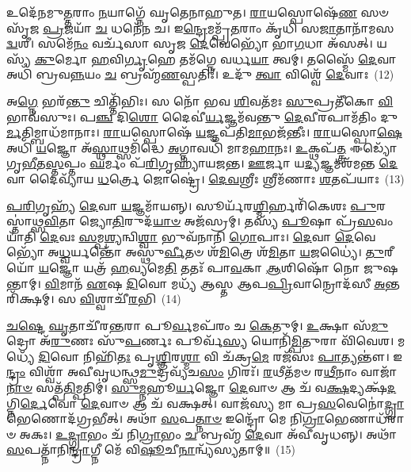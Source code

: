 {\anuvakamend[{\-\ul{𑌜}\-𑌜𑌾\-\ul{𑌨𑍈}\-𑌨𑍗𑌷᳴𑌧𑍀\-\ul{𑌨𑌾𑌂} 𑌭𑍂𑌮𑌿𑌂᳴ \ul{𑌜}\-𑌨𑌯᳴\-\ul{𑌨𑍍𑌨𑍂}\-𑌤\-\ul{𑌯𑍇} 𑌨\-\ul{𑌮𑍋} 𑌨𑌵᳴ 𑌚}]}%

𑌉𑌦𑍇᳴𑌨𑌮𑍁\-\ul{𑌤𑍍𑌤}\-𑌰𑌾𑌂 \ul{𑌨}\-𑌯𑌾𑌗𑍍𑌨𑍇᳴ 𑌘𑍃𑌤𑍇𑌨𑌾𑌹𑍁𑌤। \ul{𑌰𑌾}\-𑌯𑌸𑍍𑌪𑍋𑌷𑍇᳴\-\ul{𑌣} 𑌸𑍞 𑌸𑍃᳴𑌜 \ul{𑌪𑍍𑌰}\-𑌜𑌯𑌾᳴ \ul{𑌚} 𑌧𑌨𑍇᳴𑌨 𑌚। 𑌇\-\ul{𑌨𑍍𑌦𑍍𑌰𑍇}\-𑌮𑌮𑍍𑌪𑍍𑌰᳴\-\ul{𑌤}\-𑌰𑌾𑌂 𑌕𑍃᳴𑌧𑌿 𑌸\-\ul{𑌜𑌾}\-𑌤𑌾𑌨𑌾᳴𑌮𑌸\-\ul{𑌦𑍍𑌵}\-𑌶𑍀। 𑌸𑌮𑍇᳴\-\ul{𑌨𑌂} 𑌵𑌰𑍍𑌚᳴𑌸𑌾 𑌸𑍃𑌜 \ul{𑌦𑍇}\-𑌵𑍇𑌭𑍍𑌯𑍋᳴ 𑌭𑌾\-\ul{𑌗}\-𑌧𑌾 𑌅᳴𑌸𑌤𑍍। 𑌯𑌸𑍍𑌯᳴ \ul{𑌕𑍁}\-𑌰𑍍𑌮𑍋 \ul{𑌹}\-𑌵𑌿\-\ul{𑌰𑍍𑌗𑍃}\-𑌹𑍇 𑌤𑌮᳴𑌗𑍍𑌨𑍇 𑌵𑌰𑍍𑌧\-\ul{𑌯𑌾} 𑌤𑍍𑌵𑌮𑍍। 𑌤𑌸𑍍𑌮𑍈᳴ \ul{𑌦𑍇}\-𑌵𑌾 𑌅𑌧𑌿᳴ 𑌬𑍍𑌰𑌵\-\ul{𑌨𑍍𑌨}\-𑌯𑌂 \ul{𑌚} 𑌬𑍍𑌰𑌹𑍍𑌮᳴\-\ul{𑌣}\-𑌸𑍍𑌪𑌤𑌿𑌃᳴। 𑌉𑌦𑍁᳴ \ul{𑌤𑍍𑌵𑌾} 𑌵𑌿𑌶𑍍𑌵𑍇᳴ \ul{𑌦𑍇}\-𑌵𑌾𑌃~(12)

𑌅\-\ul{𑌗𑍍𑌨𑍇} 𑌭𑌰᳴\-\ul{𑌨𑍍𑌤𑍁} 𑌚𑌿𑌤𑍍𑌤𑌿᳴𑌭𑌿𑌃। 𑌸 𑌨𑍋᳴ 𑌭𑌵 \ul{𑌶𑌿}\-𑌵𑌤᳴𑌮𑌃 \ul{𑌸𑍁}\-𑌪𑍍𑌰𑌤𑍀᳴𑌕𑍋 \ul{𑌵𑌿}\-𑌭𑌾𑌵᳴𑌸𑍁𑌃। 𑌪\-\ul{𑌞𑍍𑌚} 𑌦𑌿\-\ul{𑌶𑍋} 𑌦𑍈𑌵𑍀॑\-\ul{𑌰𑍍𑌯}\-𑌜𑍍𑌞𑌮᳴𑌵𑌨𑍍𑌤𑍁 \ul{𑌦𑍇}\-𑌵𑍀𑌰𑌪𑌾𑌮᳴𑌤𑌿𑌂 𑌦𑍁\-\ul{𑌰𑍍𑌮}\-𑌤𑌿𑌮𑍍𑌬𑌾𑌧᳴𑌮𑌾𑌨𑌾𑌃। \ul{𑌰𑌾}\-𑌯𑌸𑍍𑌪𑍋𑌷𑍇᳴ \ul{𑌯}\-𑌜𑍍𑌞𑌪᳴𑌤𑌿\-\ul{𑌮𑌾}\-𑌭𑌜᳴𑌨𑍍𑌤𑍀𑌃। \ul{𑌰𑌾}\-𑌯𑌸𑍍𑌪𑍋\-\ul{𑌷𑍇} 𑌅𑌧𑌿᳴ \ul{𑌯}\-𑌜𑍍𑌞𑍋 𑌅᳴\-\ul{𑌸𑍍𑌥𑌾}\-𑌥𑍍𑌸𑌮𑌿᳴𑌦𑍍𑌧𑍇 \ul{𑌅}\-𑌗𑍍𑌨𑌾𑌵𑌧𑌿᳴ 𑌮𑌾𑌮\-\ul{𑌹𑌾}\-𑌨𑌃। \ul{𑌉}\-𑌕𑍍𑌥𑌪᳴\-\ul{𑌤𑍍𑌤𑍍𑌰} 𑌈𑌡𑍍𑌯𑍋᳴ 𑌗𑍃\-\ul{𑌭𑍀}\-𑌤\-\ul{𑌸𑍍𑌤}\-𑌪𑍍𑌤𑌂 \ul{𑌘}\-𑌰𑍍𑌮𑌂 𑌪᳴\-\ul{𑌰𑌿}\-𑌗𑍃𑌹𑍍𑌯𑌾᳴𑌯𑌜𑌨𑍍𑌤। \ul{𑌊}\-𑌰𑍍𑌜𑌾 𑌯\-\ul{𑌦𑍍𑌯}\-𑌜𑍍𑌞𑌮𑌶᳴𑌮𑌨𑍍𑌤 \ul{𑌦𑍇}\-𑌵𑌾 𑌦𑍈𑌵𑍍𑌯𑌾᳴𑌯 \ul{𑌧}\-𑌰𑍍𑌤𑍍𑌰𑍇 𑌜𑍋𑌷𑍍𑌟𑍍𑌰𑍇॑। \ul{𑌦𑍇}\-\-\ul{𑌵}\-𑌶𑍍𑌰𑍀𑌃 𑌶𑍍𑌰𑍀𑌮᳴𑌣𑌾𑌃 \ul{𑌶}\-𑌤𑌪᳴𑌯𑌾𑌃~(13)

\-\ul{𑌪}\-\-\ul{𑌰𑌿}\-𑌗𑍃𑌹𑍍𑌯᳴ \ul{𑌦𑍇}\-𑌵𑌾 \ul{𑌯}\-𑌜𑍍𑌞𑌮𑌾᳴𑌯𑌨𑍍𑌨𑍍। 𑌸𑍂𑌰𑍍𑌯᳴𑌰\-\ul{𑌶𑍍𑌮𑌿}\-𑌰𑍍\mbox{}𑌹𑌰𑌿᳴𑌕𑍇𑌶𑌃 \ul{𑌪𑍁}\-𑌰𑌸𑍍𑌤𑌾॑𑌥𑍍𑌸\-\ul{𑌵𑌿}\-𑌤𑌾 𑌜𑍍𑌯𑍋\-\ul{𑌤𑌿}\-𑌰𑍁𑌦᳴\-\ul{𑌯𑌾}\-\-\ul{𑍞} 𑌅𑌜᳴𑌸𑍍𑌰𑌮𑍍। 𑌤𑌸𑍍𑌯᳴ \ul{𑌪𑍂}\-𑌷𑌾 𑌪𑍍𑌰᳴\-\ul{𑌸}\-𑌵𑌂 𑌯𑌾᳴𑌤𑌿 \ul{𑌦𑍇}\-𑌵𑌃 \ul{𑌸}\-𑌮𑍍𑌪\-\ul{𑌶𑍍𑌯}\-𑌨𑍍𑌵𑌿\-\ul{𑌶𑍍𑌵𑌾} 𑌭𑍁𑌵᳴𑌨𑌾𑌨𑌿 \ul{𑌗𑍋}\-𑌪𑌾𑌃। \ul{𑌦𑍇}\-𑌵𑌾 \ul{𑌦𑍇}\-𑌵𑍇𑌭𑍍𑌯𑍋᳴ 𑌅\-\ul{𑌧𑍍𑌵}\-𑌰𑍍𑌯𑌨𑍍𑌤𑍋᳴ 𑌅𑌸𑍍𑌥𑍁\-\ul{𑌰𑍍𑌵𑍀}\-𑌤𑍞 𑌶᳴\-\ul{𑌮𑌿}\-𑌤𑍍𑌰𑍇 𑌶᳴\-\ul{𑌮𑌿}\-𑌤𑌾 \ul{𑌯}\-𑌜𑌧𑍍𑌯𑍈॑। \ul{𑌤𑍁}\-𑌰𑍀𑌯𑍋᳴ \ul{𑌯}\-𑌜𑍍𑌞𑍋 𑌯𑌤𑍍𑌰᳴ \ul{𑌹}\-𑌵𑍍𑌯𑌮𑍇\-\ul{𑌤𑌿} 𑌤𑌤𑌃᳴ 𑌪𑌾\-\ul{𑌵}\-𑌕𑌾 \ul{𑌆}\-𑌶𑌿𑌷𑍋᳴ 𑌨𑍋 𑌜𑍁𑌷𑌨𑍍𑌤𑌾𑌮𑍍। \ul{𑌵𑌿}\-𑌮𑌾𑌨᳴ \ul{𑌏}\-𑌷 \ul{𑌦𑌿}\-𑌵𑍋 𑌮𑌧𑍍𑌯᳴ 𑌆𑌸𑍍𑌤 𑌆𑌪\-\ul{𑌪𑍍𑌰𑌿}\-𑌵𑌾𑌨𑍍𑌰𑍋𑌦᳴𑌸𑍀 \ul{𑌅}\-𑌨𑍍𑌤𑌰𑌿᳴𑌕𑍍𑌷𑌮𑍍। 𑌸 \ul{𑌵𑌿}\-𑌶𑍍𑌵𑌾𑌚𑍀᳴\-\ul{𑌰}\-𑌭𑌿~(14)

\-\ul{𑌚}\-\-\ul{𑌷𑍍𑌟𑍇} \ul{𑌘𑍃}\-𑌤𑌾𑌚𑍀᳴𑌰\-\ul{𑌨𑍍𑌤}\-𑌰𑌾 𑌪𑍂\-\ul{𑌰𑍍𑌵}\-𑌮𑌪᳴𑌰𑌂 𑌚 \ul{𑌕𑍇}\-𑌤𑍁𑌮𑍍। \ul{𑌉}\-𑌕𑍍𑌷𑌾 𑌸᳴\-\ul{𑌮𑍁}\-𑌦𑍍𑌰𑍋 𑌅᳴\-\ul{𑌰𑍁}\-𑌣𑌃 𑌸𑍁᳴\-\ul{𑌪}\-𑌰𑍍𑌣𑌃 𑌪𑍂𑌰𑍍𑌵᳴\-\ul{𑌸𑍍𑌯} 𑌯𑍋𑌨𑌿᳴\-\ul{𑌮𑍍𑌪𑌿}\-𑌤𑍁𑌰𑌾 𑌵𑌿᳴𑌵𑍇𑌶। 𑌮𑌧𑍍𑌯𑍇᳴ \ul{𑌦𑌿}\-𑌵𑍋 𑌨𑌿𑌹𑌿᳴\-\ul{𑌤𑌃} 𑌪𑍃\-\ul{𑌶𑍍𑌞𑌿}\-𑌰\-\ul{𑌶𑍍𑌮𑌾} 𑌵𑌿 𑌚᳴𑌕𑍍𑌰\-\ul{𑌮𑍇} 𑌰𑌜᳴𑌸𑌃 \ul{𑌪𑌾}\-𑌤𑍍𑌯𑌨𑍍𑌤𑍗॑। 𑌇\-\ul{𑌨𑍍𑌦𑍍𑌰𑌂} 𑌵𑌿𑌶𑍍𑌵𑌾᳴ 𑌅𑌵𑍀𑌵𑍃𑌧𑌨𑍍𑌥𑍍𑌸\-\ul{𑌮𑍁}\-𑌦𑍍𑌰𑌵𑍍𑌯᳴𑌚\-\ul{𑌸𑌂} 𑌗𑌿𑌰𑌃᳴। \ul{𑌰}\-𑌥𑍀𑌤᳴𑌮𑍞 𑌰\-\ul{𑌥𑍀}\-𑌨𑌾𑌂 𑌵𑌾𑌜𑌾᳴\-\ul{𑌨𑌾}\-\-\ul{𑍞} 𑌸𑌤𑍍𑌪᳴\-\ul{𑌤𑌿}\-𑌮𑍍𑌪𑌤𑌿𑌮𑍍॑। \ul{𑌸𑍁}\-\-\ul{𑌮𑍍𑌨}\-𑌹𑍂\-\ul{𑌰𑍍𑌯}\-𑌜𑍍𑌞𑍋 \ul{𑌦𑍇}\-𑌵𑌾𑍞 𑌆 𑌚᳴ 𑌵\-\ul{𑌕𑍍𑌷}\-𑌦𑍍𑌯𑌕𑍍𑌷᳴\-\ul{𑌦}\-𑌗𑍍𑌨𑌿\-\ul{𑌰𑍍𑌦𑍇}\-𑌵𑍋 \ul{𑌦𑍇}\-𑌵𑌾𑍞 𑌆 𑌚᳴ 𑌵𑌕𑍍𑌷𑌤𑍍। 𑌵𑌾𑌜᳴𑌸𑍍𑌯 𑌮𑌾 𑌪𑍍𑌰\-\ul{𑌸}\-𑌵𑍇𑌨𑍋॑\-\ul{𑌦𑍍𑌗𑍍𑌰𑌾}\-𑌭𑍇𑌣𑍋𑌦᳴𑌗𑍍𑌰𑌭𑍀𑌤𑍍। 𑌅𑌥𑌾᳴ \ul{𑌸}\-𑌪\-\ul{𑌤𑍍𑌨𑌾}\-\-\ul{𑍞} 𑌇𑌨𑍍𑌦𑍍𑌰𑍋᳴ 𑌮𑍇 𑌨𑌿\-\ul{𑌗𑍍𑌰𑌾}\-𑌭𑍇𑌣𑌾𑌧᳴𑌰𑌾𑍞 𑌅𑌕𑌃। \ul{𑌉}\-\-\ul{𑌦𑍍𑌗𑍍𑌰𑌾}\-𑌭𑌂 𑌚᳴ 𑌨𑌿\-\ul{𑌗𑍍𑌰𑌾}\-𑌭𑌂 \ul{𑌚} 𑌬𑍍𑌰𑌹𑍍𑌮᳴ \ul{𑌦𑍇}\-𑌵𑌾 𑌅᳴𑌵𑍀𑌵𑍃𑌧𑌨𑍍𑌨𑍍। 𑌅𑌥𑌾᳴ \ul{𑌸}\-𑌪𑌤𑍍𑌨𑌾᳴𑌨𑌿\-\ul{𑌨𑍍𑌦𑍍𑌰𑌾}\-𑌗𑍍𑌨𑍀 𑌮𑍇᳴ 𑌵𑌿\-\ul{𑌷𑍂}\-𑌚𑍀\-\ul{𑌨𑌾}\-𑌨𑍍𑌵𑍍𑌯᳴𑌸𑍍𑌯𑌤𑌾𑌮𑍍॥~(15)

